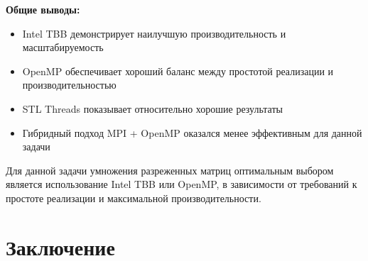 \documentclass[12pt]{article}
\begin{document}
\textbf{Общие выводы:}
\begin{itemize}
\item Intel TBB демонстрирует наилучшую производительность и масштабируемость
\item OpenMP обеспечивает хороший баланс между простотой реализации и производительностью
\item STL Threads показывает относительно хорошие результаты
\item Гибридный подход MPI + OpenMP оказался менее эффективным для данной задачи
\end{itemize}
Для данной задачи умножения разреженных матриц оптимальным выбором является использование Intel TBB или OpenMP, в зависимости от требований к простоте реализации и максимальной производительности.
\section{Заключение}
\end{document}
